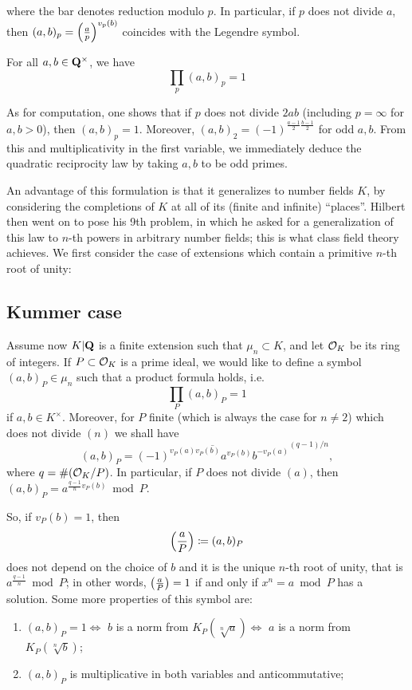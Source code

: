 \documentclass{article}
\begin{document}
where the bar denotes reduction modulo $p$.
In particular, if $p$ does not divide $a$, then $(a,b)_p = \left(\frac{a}{p}\right)^{v_p(b)}$ coincides with the Legendre symbol.
\begin{thm}
	For all $a,b\in \mathbf{Q}^\times$, we have
	\[
		\prod_{p} (a,b)_p = 1
	\]
\end{thm}
As for computation, one shows that if $p$ does not divide $2ab$ (including $p=\infty$ for $a,b>0$), then $(a,b)_p = 1$. Moreover, $(a,b)_2=(-1)^{\frac{a-1}{2}\frac{b-1}{2}}$ for odd $a,b$. From this and multiplicativity in the first variable, we immediately deduce the quadratic reciprocity law by taking $a,b$ to be odd primes.

An advantage of this formulation is that it generalizes to number fields $K$, by considering the completions of $K$ at all of its (finite and infinite) ``places''. Hilbert then went on to pose his 9th problem, in which he asked for a generalization of this law to $n$-th powers in arbitrary number fields; this is what class field theory achieves. We first consider the case of extensions which contain a primitive $n$-th root of unity:

\subsection{Kummer case}
Assume now $K|\mathbf{Q}$ is a finite extension such that $\mu_n\subset K$, and let $\mathcal{O}_K$ be its ring of integers. If $P\subset \mathcal{O}_K$ is a prime ideal, we would like to define a symbol $(a,b)_P\in \mu_n$ such that a product formula holds, i.e.
\[
	\prod_{P} (a,b)_P = 1
\]
if $a,b\in K^\times$. Moreover, for $P$ finite (which is always the case for $n\ne 2$) which does not divide $(n)$ we shall have \[
	(a,b)_P = \overline{(-1)^{v_P(a)v_P(b)}a^{v_P(b)}b^{-v_P(a)}}^{(q-1)/n},\] where $q = \#(\mathcal{O}_K/P)$. In particular, if $P$ does not divide $(a)$, then $(a,b)_P =
	a^{\frac{q-1}{n}v_P(b)}\bmod P$.

So, if $v_P(b)=1$, then
\[
	\left(\frac{a}{P}\right) \coloneqq (a,b)_P
\]
does not depend on the choice of $b$ and it is the unique $n$-th root of unity, that is $a^{\frac{q-1}{n}}\bmod P$; in other words, $\left(\frac{a}{P}\right) = 1$ if and only if $x^n =a \bmod P$ has a solution. Some more properties of this symbol are:
\begin{enumerate}
	\item $(a,b)_P=1 \iff$ $b$ is a norm from $K_P(\sqrt[n]{a}) \iff$ $a$ is a norm from $K_P(\sqrt[n]{b})$;
	\item $(a,b)_P$ is multiplicative in both variables and anticommutative;
\end{enumerate}
\end{document}
